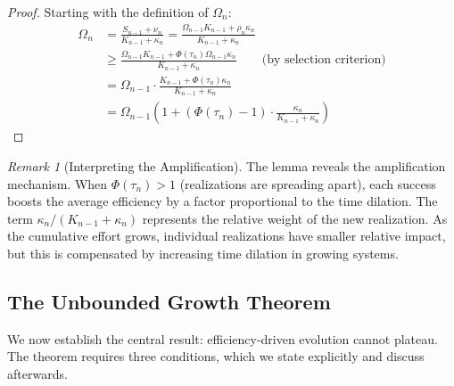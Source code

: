 \documentclass[11pt]{article}
\theoremstyle{definition}
\theoremstyle{remark}
\newtheorem{remark}[theorem]{Remark}
\begin{document}
\begin{proof}
Starting with the definition of $\Omega_n$:
\begin{align*}
\Omega_n &= \frac{S_{n-1} + \nu_n}{K_{n-1} + \kappa_n} = \frac{\Omega_{n-1} K_{n-1} + \rho_n \kappa_n}{K_{n-1} + \kappa_n}\\
&\geq \frac{\Omega_{n-1} K_{n-1} + \Phi(\tau_n) \Omega_{n-1} \kappa_n}{K_{n-1} + \kappa_n} \qquad \text{(by selection criterion)}\\
&= \Omega_{n-1} \cdot \frac{K_{n-1} + \Phi(\tau_n) \kappa_n}{K_{n-1} + \kappa_n}\\
&= \Omega_{n-1} \left(1 + (\Phi(\tau_n) - 1) \cdot \frac{\kappa_n}{K_{n-1} + \kappa_n}\right)
\end{align*}
\end{proof}

\begin{remark}[Interpreting the Amplification]
The lemma reveals the amplification mechanism. When $\Phi(\tau_n) > 1$ (realizations are spreading apart), each success boosts the average efficiency by a factor proportional to the time dilation. The term $\kappa_n/(K_{n-1} + \kappa_n)$ represents the relative weight of the new realization. As the cumulative effort grows, individual realizations have smaller relative impact, but this is compensated by increasing time dilation in growing systems.
\end{remark}

\subsection{The Unbounded Growth Theorem}

We now establish the central result: efficiency-driven evolution cannot plateau. The theorem requires three conditions, which we state explicitly and discuss afterwards.
\end{document}
